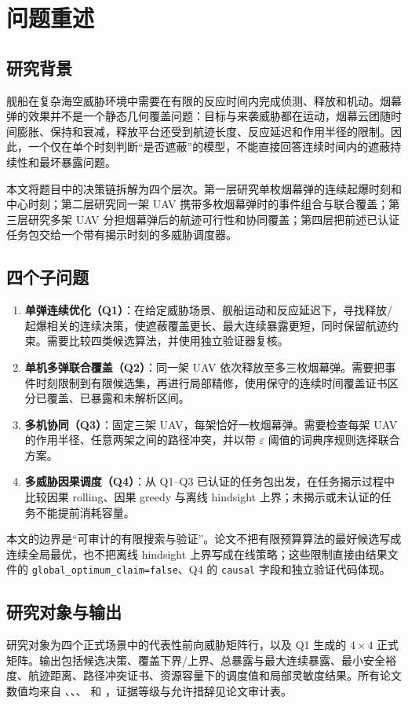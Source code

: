 \section{问题重述}

\subsection{研究背景}

舰船在复杂海空威胁环境中需要在有限的反应时间内完成侦测、释放和机动。烟幕弹的效果并不是一个静态几何覆盖问题：目标与来袭威胁都在运动，烟幕云团随时间膨胀、保持和衰减，释放平台还受到航迹长度、反应延迟和作用半径的限制。因此，一个仅在单个时刻判断“是否遮蔽”的模型，不能直接回答连续时间内的遮蔽持续性和最坏暴露问题。

本文将题目中的决策链拆解为四个层次。第一层研究单枚烟幕弹的连续起爆时刻和中心时刻；第二层研究同一架 UAV 携带多枚烟幕弹时的事件组合与联合覆盖；第三层研究多架 UAV 分担烟幕弹后的航迹可行性和协同覆盖；第四层把前述已认证任务包交给一个带有揭示时刻的多威胁调度器。

\subsection{四个子问题}

\begin{enumerate}
  \item \textbf{单弹连续优化（Q1）}：在给定威胁场景、舰船运动和反应延迟下，寻找释放/起爆相关的连续决策，使遮蔽覆盖更长、最大连续暴露更短，同时保留航迹约束。需要比较四类候选算法，并使用独立验证器复核。
  \item \textbf{单机多弹联合覆盖（Q2）}：同一架 UAV 依次释放至多三枚烟幕弹。需要把事件时刻限制到有限候选集，再进行局部精修，使用保守的连续时间覆盖证书区分已覆盖、已暴露和未解析区间。
  \item \textbf{多机协同（Q3）}：固定三架 UAV，每架恰好一枚烟幕弹。需要检查每架 UAV 的作用半径、任意两架之间的路径冲突，并以带 $\varepsilon$ 阈值的词典序规则选择联合方案。
  \item \textbf{多威胁因果调度（Q4）}：从 Q1--Q3 已认证的任务包出发，在任务揭示过程中比较因果 rolling、因果 greedy 与离线 hindsight 上界；未揭示或未认证的任务不能提前消耗容量。
\end{enumerate}

本文的边界是“可审计的有限搜索与验证”。论文不把有限预算算法的最好候选写成连续全局最优，也不把离线 hindsight 上界写成在线策略；这些限制直接由结果文件的 \texttt{global\_optimum\_claim=false}、Q4 的 \texttt{causal} 字段和独立验证代码体现。

\subsection{研究对象与输出}

研究对象为四个正式场景中的代表性前向威胁矩阵行，以及 Q1 生成的 $4\times4$ 正式矩阵。输出包括候选决策、覆盖下界/上界、总暴露与最大连续暴露、最小安全裕度、航迹距离、路径冲突证书、资源容量下的调度值和局部灵敏度结果。所有论文数值均来自 、、、 和 ，证据等级与允许措辞见论文审计表。
